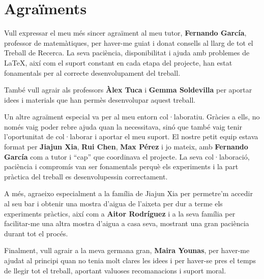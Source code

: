 \section*{Agraïments}

Vull expressar el meu més sincer agraïment al meu tutor, \textbf{Fernando García}, professor de matemàtiques, per haver-me guiat i donat consells al llarg de tot el Treball de Recerca. La seva paciència, disponibilitat i ajuda amb problemes de LaTeX, així com el suport constant en cada etapa del projecte, han estat fonamentals per al correcte desenvolupament del treball.

També vull agrair als professors \textbf{Àlex Tuca} i \textbf{Gemma Soldevilla} per aportar idees i materials que han permès desenvolupar aquest treball.

Un altre agraïment especial va per al meu entorn col·laboratiu. Gràcies a ells, no només vaig poder rebre ajuda quan la necessitava, sinó que també vaig tenir l’oportunitat de col·laborar i aportar el meu suport. El nostre petit equip estava format per \textbf{Jiajun Xia}, \textbf{Rui Chen}, \textbf{Max Pérez} i jo mateix, amb \textbf{Fernando García} com a tutor i “cap” que coordinava el projecte. La seva col·laboració, paciència i compromís van ser fonamentals perquè els experiments i la part pràctica del treball es desenvolupessin correctament.

A més, agraeixo especialment a la família de Jiajun Xia per permetre’m accedir al seu bar i obtenir una mostra d’aigua de l’aixeta per dur a terme els experiments pràctics, així com a \textbf{Aitor Rodríguez} i a la seva família per facilitar-me una altra mostra d’aigua a casa seva, mostrant una gran paciència durant tot el procés.

Finalment, vull agrair a la meva germana gran, \textbf{Maira Younas}, per haver-me ajudat al principi quan no tenia molt clares les idees i per haver-se pres el temps de llegir tot el treball, aportant valuoses recomanacions i suport moral.

